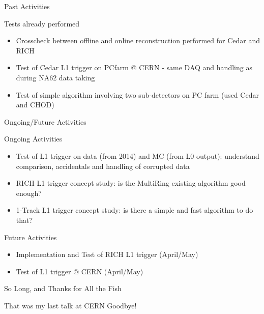\begin{frame}{Past Activities}{}
	\begin{block}{Tests already performed}
		\begin{itemize}
		  \item Crosscheck between offline and online reconstruction performed for
		  Cedar and RICH
		  \item Test of Cedar L1 trigger on PCfarm @ CERN - same DAQ and handling as during NA62
data taking
		  \item Test of simple algorithm involving two sub-detectors on PC farm (used Cedar and CHOD)
		\end{itemize}
	\end{block}
\end{frame}

\begin{frame}{Ongoing/Future Activities}{}
	\begin{block}{Ongoing Activities}
		\begin{itemize}
		  \item Test of L1 trigger on data (from 2014) and MC (from L0 output): understand comparison,
			accidentals and handling of corrupted data
			\item RICH L1 trigger concept study: is the MultiRing existing algorithm good
			enough?
			\item 1-Track L1 trigger concept study: is there a simple and fast algorithm to
			do that?
		\end{itemize}
	\end{block}
	
	\begin{block}{Future Activities}
		\begin{itemize}
			\item Implementation and Test of RICH L1 trigger (April/May)
			\item Test of L1 trigger @ CERN (April/May)
		\end{itemize}
	\end{block}
\end{frame}

\begin{frame}{So Long, and Thanks for All the Fish}{}
	\begin{block}{That was my last talk at CERN}
		Goodbye!
	\end{block}
\end{frame}